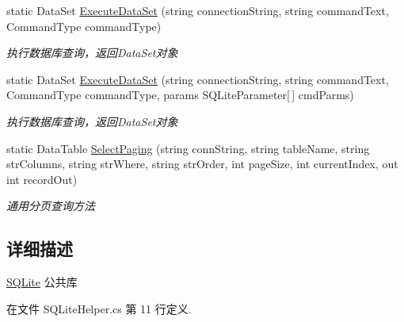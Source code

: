 \begin{DoxyCompactItemize}
static Data\-Set \hyperlink{class_x_c_l_net_tools_1_1_data_base_1_1_s_q_lite_1_1_s_q_lite_helper_a4806433651289941b9507696bb3a64d0}{Execute\-Data\-Set} (string connection\-String, string command\-Text, Command\-Type command\-Type)
\begin{DoxyCompactList}\small\item\em 执行数据库查询，返回\-Data\-Set对象 \end{DoxyCompactList}\item 
static Data\-Set \hyperlink{class_x_c_l_net_tools_1_1_data_base_1_1_s_q_lite_1_1_s_q_lite_helper_a58876af7deacc80974cddb8b1feddee5}{Execute\-Data\-Set} (string connection\-String, string command\-Text, Command\-Type command\-Type, params S\-Q\-Lite\-Parameter\mbox{[}$\,$\mbox{]} cmd\-Parms)
\begin{DoxyCompactList}\small\item\em 执行数据库查询，返回\-Data\-Set对象 \end{DoxyCompactList}\item 
static Data\-Table \hyperlink{class_x_c_l_net_tools_1_1_data_base_1_1_s_q_lite_1_1_s_q_lite_helper_ac6c40082dce532c8ea61efc23c00a825}{Select\-Paging} (string conn\-String, string table\-Name, string str\-Columns, string str\-Where, string str\-Order, int page\-Size, int current\-Index, out int record\-Out)
\begin{DoxyCompactList}\small\item\em 通用分页查询方法 \end{DoxyCompactList}\end{DoxyCompactItemize}


\subsection{详细描述}
\hyperlink{namespace_x_c_l_net_tools_1_1_data_base_1_1_s_q_lite}{S\-Q\-Lite} 公共库 



在文件 S\-Q\-Lite\-Helper.\-cs 第 11 行定义.



